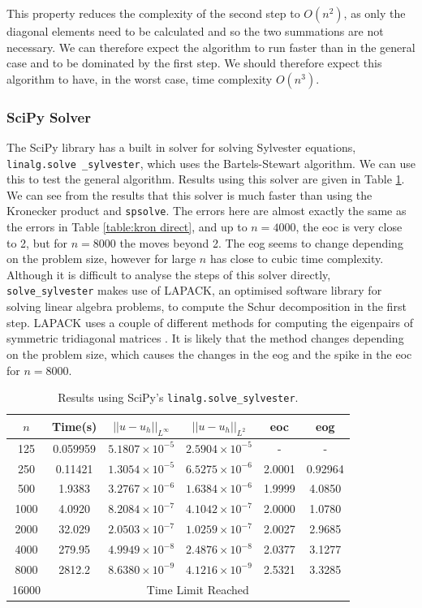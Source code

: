 \documentclass[11pt]{article}
\numberwithin{equation}{section}
\begin{document}
This property reduces the complexity of the second step to $O(n^2)$, as only the diagonal elements need to be calculated and so the two summations are not necessary. We can therefore expect the algorithm to run faster than in the general case and to be dominated by the first step. We should therefore expect this algorithm to have, in the worst case, time complexity $O(n^3)$.

\subsubsection*{SciPy Solver}
The SciPy library has a built in solver for solving Sylvester equations, \texttt{linalg.solve \_sylvester}, which uses the Bartels-Stewart algorithm. We can use this to test the general algorithm. Results using this solver are given in Table \ref{table:bartels scipy}. We can see from the results that this solver is much faster than using the Kronecker product and \texttt{spsolve}. The errors here are almost exactly the same as the errors in Table \ref{table:kron direct}, and up to $n=4000$, the eoc is very close to 2, but for $n=8000$ the moves beyond 2. The eog seems to change depending on the problem size, however for large $n$ has close to cubic time complexity. Although it is difficult to analyse the steps of this solver directly, \texttt{solve\_sylvester} makes use of LAPACK, an optimised software library for solving linear algebra problems, to compute the Schur decomposition in the first step. LAPACK uses a couple of different methods for computing the eigenpairs of symmetric tridiagonal matrices \cite{Demmel}. It is likely that the method changes depending on the problem size, which causes the changes in the eog and the spike in the eoc for $n=8000$. 

\begin{table}[H]
\centering
\begin{tabular}{|c|c|c|c|c|c|}
\hline
$n$ & Time(s) & $|| u - u_h ||_{L^{\infty}}$ &$|| u - u_h ||_{L^{2}}$ & eoc & eog \\
\hline
125 & 0.059959 & $5.1807 \times 10^{-5}$ & $2.5904 \times 10^{-5}$ & - & - \\
250 & 0.11421 & $1.3054 \times 10^{-5}$ & $6.5275 \times 10^{-6}$ & 2.0001 & 0.92964 \\
500 & 1.9383 & $3.2767 \times 10^{-6}$ & $1.6384 \times 10^{-6}$ & 1.9999 & 4.0850  \\
1000 & 4.0920 & $8.2084 \times 10^{-7}$ & $4.1042 \times 10^{-7}$ & 2.0000 & 1.0780 \\
2000 & 32.029 & $2.0503 \times 10^{-7}$ & $1.0259 \times 10^{-7}$ & 2.0027 & 2.9685  \\
4000 & 279.95 & $4.9949 \times 10^{-8}$ & $2.4876 \times 10^{-8}$ & 2.0377 & 3.1277  \\
8000 & 2812.2 & $8.6380 \times 10^{-9}$ & $4.1216 \times 10^{-9}$ & 2.5321 & 3.3285 \\
\cline{2-6}
16000 & \multicolumn{5}{c|}{Time Limit Reached} \\
\hline
\end{tabular}
\caption{Results using SciPy's \texttt{linalg.solve\_sylvester}.}
\label{table:bartels scipy}
\end{table}
\end{document}
